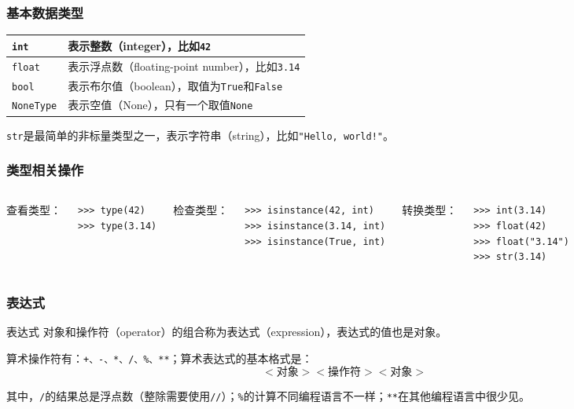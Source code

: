 \documentclass[aspectratio=169, 14pt]{beamer}
\begin{document}
\begin{frame}
	\frametitle{基本数据类型}
	\begin{tabular}{l l}
		\hline
		\texttt{int}      & 表示整数（integer），比如\texttt{42}                    \\
		\hline
		\texttt{float}    & 表示浮点数（floating-point number），比如\texttt{3.14}   \\
		\hline
		\texttt{bool}     & 表示布尔值（boolean），取值为\texttt{True}和\texttt{False} \\
		\hline
		\texttt{NoneType} & 表示空值（None），只有一个取值\texttt{None}                 \\
		\hline
	\end{tabular}

	\texttt{str}是最简单的\alert{非标量}类型之一，表示字符串（string），比如\texttt{"Hello, world!"}。

\end{frame}

\begin{frame}[fragile]
	\frametitle{类型相关操作}

	\begin{columns}
		\alert{查看类型}：
		\begin{verbatim}
>>> type(42)
>>> type(3.14)
\end{verbatim}

		\alert{检查类型}：
		\begin{verbatim}
>>> isinstance(42, int)
>>> isinstance(3.14, int)
>>> isinstance(True, int)
\end{verbatim}
		\alert{转换类型}：
		\begin{verbatim}
>>> int(3.14)
>>> float(42)
>>> float("3.14")
>>> str(3.14)
\end{verbatim}
	\end{columns}

\end{frame}

\begin{frame}
	\frametitle{表达式}
	\begin{exampleblock}{表达式}
		对象和操作符（operator）的组合称为\alert{表达式}（expression），表达式的值也是对象。
	\end{exampleblock}
	算术操作符有：\texttt{+、-、*、/、\%、**}；算术表达式的基本格式是：
	$$<\mbox{对象}> <\mbox{操作符}> <\mbox{对象}>$$

	其中，\texttt{/}的结果总是浮点数（整除需要使用\texttt{//}）；\texttt{\%}的计算不同编程语言不一样；\texttt{**}在其他编程语言中很少见。
\end{frame}
\end{document}
